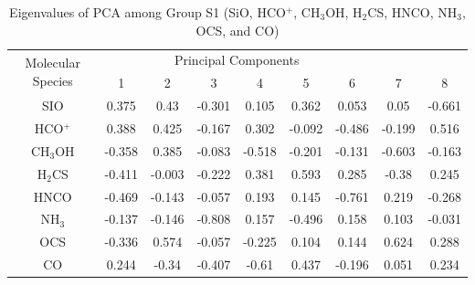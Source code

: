 \documentclass{aa}
\begin{document}
\begin{CJK*}{UTF8}{gbsn}
\begin{table}[htbp]
\centering
\begin{tabular}{ccccccccc}
\hline\hline
\multirow{2}{*}{Molecular Species} & \multicolumn{6}{c}{Principal Components}                 \\ \cline{2-9} 
                                   & 1       & 2       & 3       & 4       & 5      & 6      &7   &8 \\ \hline
SIO   & 0.375  & 0.43   & -0.301 & 0.105  & 0.362  & 0.053  & 0.05   & -0.661  \\ \hline
HCO$^+$   & 0.388  & 0.425  & -0.167 & 0.302  & -0.092 & -0.486 & -0.199 & 0.516  \\ \hline
CH$_3$OH & -0.358 & 0.385  & -0.083 & -0.518 & -0.201 & -0.131 & -0.603 & -0.163 \\ \hline
H$_2$CS  & -0.411 & -0.003 & -0.222 & 0.381  & 0.593  & 0.285  & -0.38  & 0.245 \\ \hline
HNCO  & -0.469 & -0.143 & -0.057 & 0.193  & 0.145  & -0.761 & 0.219  & -0.268 \\ \hline
NH$_3$   & -0.137 & -0.146 & -0.808 & 0.157  & -0.496 & 0.158  & 0.103  & -0.031 \\ \hline
OCS   & -0.336 & 0.574  & -0.057 & -0.225 & 0.104  & 0.144  & 0.624  & 0.288  \\ \hline
CO    & 0.244  & -0.34  & -0.407 & -0.61  & 0.437  & -0.196 & 0.051  & 0.234 \\ \hline\hline
\end{tabular}
\caption{Eigenvalues of PCA among Group S1 (SiO, HCO$^+$, CH$_3$OH, H$_2$CS, HNCO, NH$_3$, OCS, and CO)}
\label{table-shock-1-eigen}
\end{table}



\end{CJK*}
\end{document}
